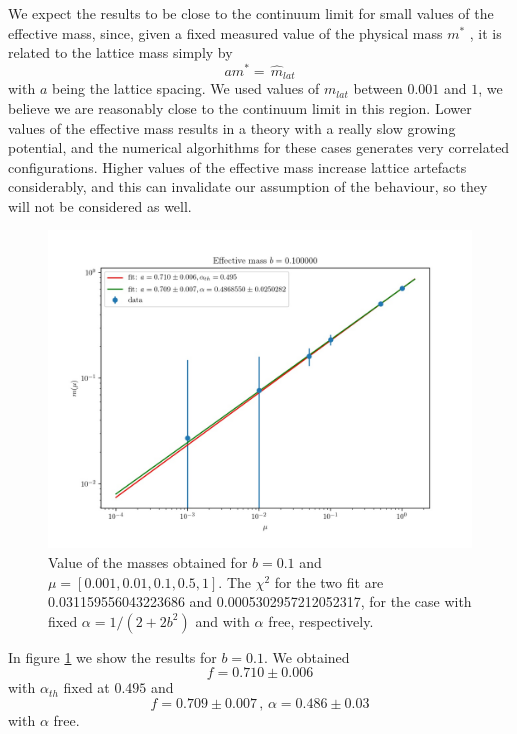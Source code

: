 \documentclass[12pt,a4paper]{report}
\begin{document}
We expect the results to be close to the continuum limit for small values of the effective mass, since, given a fixed measured value of the physical mass $m^*$ , it is related to the lattice mass simply by \begin{equation}
a m^* =  \, \hat m_{lat}
\end{equation} with $a$ being the lattice spacing. We used  values of $m_{lat}$ between $0.001$ and $1$, we believe we are reasonably close to the continuum limit in this region. Lower values of the effective mass results in a theory with a really slow growing potential, and the numerical algorhithms for these cases generates very correlated configurations. Higher values of the effective mass increase lattice artefacts considerably, and this can invalidate our assumption of the behaviour, so they will not be considered as well.
\begin{figure}
\label{fig:mass_scaling_b0.1}
\centering
\includegraphics[width=1.0\textwidth]{b0_1}
\caption{Value of the masses obtained for $b=0.1$ and 
$\mu = [0.001,0.01,0.1,0.5,1]$. The $\chi^2$ for the two fit are 0.031159556043223686 and 0.0005302957212052317, for the case with fixed $\alpha = 1/(2+2b^2)$ and with $\alpha$ free, respectively.}
\end{figure}

In figure \ref{fig:mass_scaling_b0.1} we show the results for $b=0.1$. We obtained \begin{equation}
f = 0.710 \pm 0.006
\end{equation} with $\alpha_{th}$ fixed at $0.495$ and \begin{equation}
f= 0.709 \pm 0.007 \,,\, \alpha = 0.486 \pm 0.03
\end{equation} with $\alpha$ free.
\end{document}
